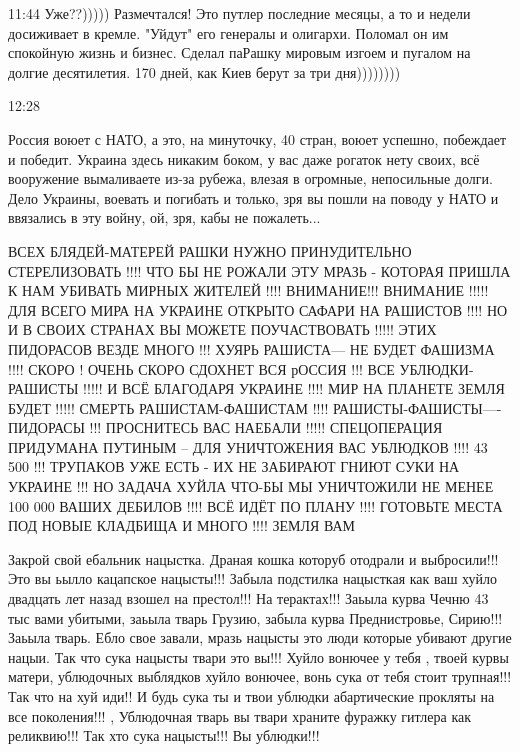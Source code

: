{%
11:44
Уже??))))) Размечтался!
Это путлер последние месяцы, а то и недели досиживает в кремле.
"Уйдут" его генералы и олигархи. Поломал он им спокойную жизнь и бизнес.
Сделал паРашку мировым изгоем и пугалом на долгие десятилетия.
170 дней, как Киев берут за три дня))))))))

12:28

Россия воюет с НАТО, а это, на минуточку, 40 стран, воюет успешно, побеждает и
победит. Украина здесь никаким боком, у вас даже рогаток нету своих, всё
вооружение вымаливаете из-за рубежа, влезая в огромные, непосильные долги. Дело
Украины, воевать и погибать и только, зря вы пошли на поводу у НАТО и ввязались
в эту войну, ой, зря, кабы не пожалеть...

ВСЕХ БЛЯДЕЙ-МАТЕРЕЙ РАШКИ НУЖНО ПРИНУДИТЕЛЬНО СТЕРЕЛИЗОВАТЬ !!!! ЧТО БЫ НЕ
РОЖАЛИ ЭТУ МРАЗЬ - КОТОРАЯ ПРИШЛА К НАМ УБИВАТЬ МИРНЫХ ЖИТЕЛЕЙ !!!! ВНИМАНИЕ!!!
ВНИМАНИЕ !!!!! ДЛЯ ВСЕГО МИРА НА УКРАИНЕ ОТКРЫТО САФАРИ НА РАШИСТОВ !!!! НО И В
СВОИХ СТРАНАХ ВЫ МОЖЕТЕ ПОУЧАСТВОВАТЬ !!!!! ЭТИХ ПИДОРАСОВ ВЕЗДЕ МНОГО !!!
ХУЯРЬ РАШИСТА--- НЕ БУДЕТ ФАШИЗМА !!!! СКОРО ! ОЧЕНЬ СКОРО СДОХНЕТ ВСЯ рОССИЯ
!!! ВСЕ УБЛЮДКИ-РАШИСТЫ !!!!! И ВСЁ БЛАГОДАРЯ УКРАИНЕ !!!! МИР НА ПЛАНЕТЕ ЗЕМЛЯ
БУДЕТ !!!!! СМЕРТЬ РАШИСТАМ-ФАШИСТАМ !!!! РАШИСТЫ-ФАШИСТЫ----ПИДОРАСЫ !!!
ПРОСНИТЕСЬ ВАС НАЕБАЛИ !!!!! СПЕЦОПЕРАЦИЯ ПРИДУМАНА ПУТИНЫМ -- ДЛЯ УНИЧТОЖЕНИЯ
ВАС УБЛЮДКОВ !!!! 43 500 !!! ТРУПАКОВ УЖЕ ЕСТЬ - ИХ НЕ ЗАБИРАЮТ ГНИЮТ СУКИ НА
УКРАИНЕ !!! НО ЗАДАЧА ХУЙЛА ЧТО-БЫ МЫ УНИЧТОЖИЛИ НЕ МЕНЕЕ 100 000 ВАШИХ ДЕБИЛОВ
!!!! ВСЁ ИДЁТ ПО ПЛАНУ !!!! ГОТОВЬТЕ МЕСТА ПОД НОВЫЕ КЛАДБИЩА И МНОГО !!!!
ЗЕМЛЯ ВАМ 


Закрой свой ебальник нацыстка. Драная кошка которуб отодрали и выбросили!!! Это
вы ьылло кацапское нацысты!!! Забыла подстилка нацысткая как ваш хуйло двадцать
лет назад взошел на престол!!! На терактах!!! Заьыла курва Чечню 43 тыс вами
убитыми, заьыла тварь Грузию, забыла курва Преднистровье, Сирию!!! Заьыла
тварь. Ебло свое завали, мразь нацысты это люди которые убивают другие нацыи.
Так что сука нацысты твари это вы!!! Хуйло вонючее у тебя , твоей курвы матери,
ублюдочных выблядков хуйло вонючее, вонь сука от тебя стоит трупная!!! Так что
на хуй иди!! И будь сука ты и твои ублюдки абартические прокляты на все
поколения!!! , Ублюдочная тварь вы твари храните фуражку гитлера как
реликвию!!! Так хто сука нацысты!!! Вы ублюдки!!!

}
